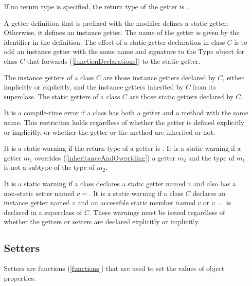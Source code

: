 \documentclass{article}
\newcommand{\code}[1]{{\sf #1}}
\begin{document}

\LMHash{}
If no return type is specified, the return type of the getter is  \DYNAMIC{}.

\LMHash{}
A getter definition that is prefixed with the \STATIC{} modifier defines a static getter. Otherwise, it defines an instance getter. The name of the getter is given by the identifier in the definition. The effect of a static getter declaration in class $C$ is to add an instance getter with the same name and signature to the \code{Type} object for class $C$ that forwards (\ref{functionDeclarations})  to the static getter.


\LMHash{}
The instance getters of a class $C$ are those instance getters declared by $C$, either implicitly or explicitly, and the instance getters inherited by $C$ from its superclass. The static getters of a class $C$ are those static getters declared by $C$.

\LMHash{}
It is a compile-time error if a class has both a getter and a method with the same name. This restriction holds regardless of whether the getter is defined explicitly or implicitly, or whether the getter or the method are inherited or not.


\LMHash{}
It is a static warning if the return type of a getter is \VOID.
It is a static warning if a getter $m_1$ overrides  (\ref{inheritanceAndOverriding}) a getter 
$m_2$ and the type of $m_1$ is not a subtype of the type of $m_2$.   

\LMHash{}
It is a static warning if a class  declares a static getter named $v$ and also has a non-static setter named $v=$. It is a static warning if a class $C$ declares an instance getter named $v$ and an accessible static member named $v$ or $v=$ is declared in a superclass of $C$. These warnings must be issued regardless of whether the getters or setters are declared explicitly or implicitly.

\subsection{Setters}

\LMHash{}
Setters are functions (\ref{functions}) that are used to set the values of object properties.
\end{document}
